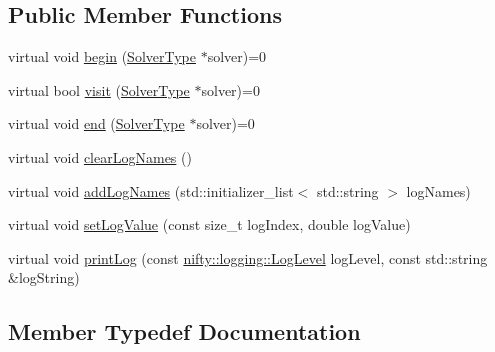 \subsection*{Public Member Functions}
\begin{DoxyCompactItemize}
\item 
virtual void \hyperlink{classnifty_1_1graph_1_1optimization_1_1common_1_1VisitorBase_a9560f91b3b7667fd560cc763dabaf0d0}{begin} (\hyperlink{classnifty_1_1graph_1_1optimization_1_1common_1_1VisitorBase_a233e657d5334c972e39a44ac675f6e85}{Solver\+Type} $\ast$solver)=0
\item 
virtual bool \hyperlink{classnifty_1_1graph_1_1optimization_1_1common_1_1VisitorBase_aff1cecd18a8436d5e0991fcf32f56400}{visit} (\hyperlink{classnifty_1_1graph_1_1optimization_1_1common_1_1VisitorBase_a233e657d5334c972e39a44ac675f6e85}{Solver\+Type} $\ast$solver)=0
\item 
virtual void \hyperlink{classnifty_1_1graph_1_1optimization_1_1common_1_1VisitorBase_a484ee4ba40a202fe2c49432506276548}{end} (\hyperlink{classnifty_1_1graph_1_1optimization_1_1common_1_1VisitorBase_a233e657d5334c972e39a44ac675f6e85}{Solver\+Type} $\ast$solver)=0
\item 
virtual void \hyperlink{classnifty_1_1graph_1_1optimization_1_1common_1_1VisitorBase_a0f7bfb9cc07cc4bc1c0b6d0ef1fd8e7f}{clear\+Log\+Names} ()
\item 
virtual void \hyperlink{classnifty_1_1graph_1_1optimization_1_1common_1_1VisitorBase_a73804c5f23d41036e8d83df9ff89f313}{add\+Log\+Names} (std\+::initializer\+\_\+list$<$ std\+::string $>$ log\+Names)
\item 
virtual void \hyperlink{classnifty_1_1graph_1_1optimization_1_1common_1_1VisitorBase_a2a086bb79dfe9b59ec6d1dd4f9a7e138}{set\+Log\+Value} (const size\+\_\+t log\+Index, double log\+Value)
\item 
virtual void \hyperlink{classnifty_1_1graph_1_1optimization_1_1common_1_1VisitorBase_abc345e20d2aa73df274b6f8a001bc296}{print\+Log} (const \hyperlink{namespacenifty_1_1logging_a3385625f9a0dbb17f70c47d3fca2f64d}{nifty\+::logging\+::\+Log\+Level} log\+Level, const std\+::string \&log\+String)
\end{DoxyCompactItemize}


\subsection{Member Typedef Documentation}
\hypertarget{classnifty_1_1graph_1_1optimization_1_1common_1_1VisitorBase_a233e657d5334c972e39a44ac675f6e85}{}
